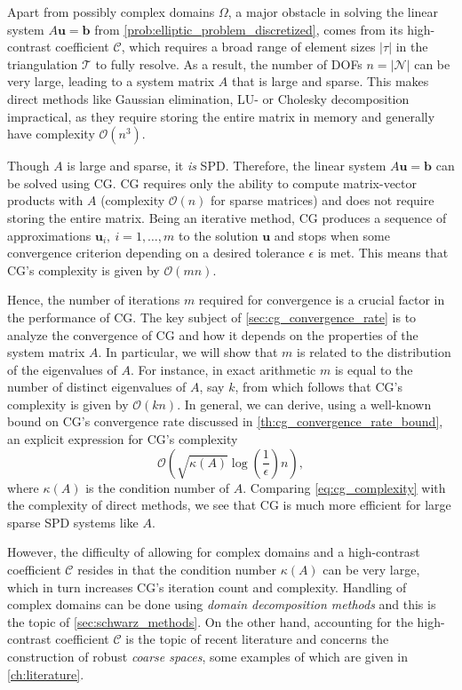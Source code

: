 Apart from possibly complex domains $\Omega$, a major obstacle in solving  the linear system $A\mathbf{u} = \mathbf{b}$ from \cref{prob:elliptic_problem_discretized}, comes from its high-contrast coefficient $\mathcal{C}$, which requires a broad range of element sizes $|\tau|$ in the triangulation $\mathcal{T}$ to fully resolve. As a result, the number of DOFs $n = |\mathcal{N}|$ can be very large, leading to a system matrix $A$ that is large and sparse. This makes direct methods like Gaussian elimination, LU- or Cholesky decomposition impractical, as they require storing the entire matrix in memory and generally have complexity $\mathcal{O}(n^3)$.

Though $A$ is large and sparse, it \textit{is} SPD. Therefore, the linear system $A\mathbf{u} = \mathbf{b}$ can be solved using CG. CG requires only the ability to compute matrix-vector products with $A$ (complexity $\mathcal{O}(n)$ for sparse matrices) and does not require storing the entire matrix. Being an iterative method, CG produces a sequence of approximations $\mathbf{u}_i, \ i = 1,\dots,m$ to the solution $\mathbf{u}$ and stops when some convergence criterion depending on a desired tolerance $\epsilon$ is met. This means that CG's complexity is given by $\mathcal{O}(mn)$.

Hence, the number of iterations $m$ required for convergence is a crucial factor in the performance of CG. The key subject of \cref{sec:cg_convergence_rate} is to analyze the convergence of CG and how it depends on the properties of the system matrix $A$. In particular, we will show that $m$ is related to the distribution of the eigenvalues of $A$. For instance, in exact arithmetic $m$ is equal to the number of distinct eigenvalues of $A$, say $k$, from which follows that CG's complexity is given by $\mathcal{O}(kn)$. In general, we can derive, using a well-known bound on CG's convergence rate discussed in \cref{th:cg_convergence_rate_bound}, an explicit expression for CG's complexity
\begin{equation}
  \mathcal{O}\left(\sqrt{\kappa(A)}\log\left(\frac{1}{\epsilon}\right)n\right),
  \label{eq:cg_complexity}
\end{equation}
where $\kappa(A)$ is the condition number of $A$. Comparing \cref{eq:cg_complexity} with the complexity of direct methods, we see that CG is much more efficient for large sparse SPD systems like $A$. 

However, the difficulty of allowing for complex domains and a high-contrast coefficient $\mathcal{C}$ resides in that the condition number $\kappa(A)$ can be very large, which in turn increases CG's iteration count and complexity. Handling of complex domains can be done using \textit{domain decomposition methods} and this is the topic of \cref{sec:schwarz_methods}. On the other hand, accounting for the high-contrast coefficient $\mathcal{C}$ is the topic of recent literature and concerns the construction of robust \textit{coarse spaces}, some examples of which are given in \cref{ch:literature}.

